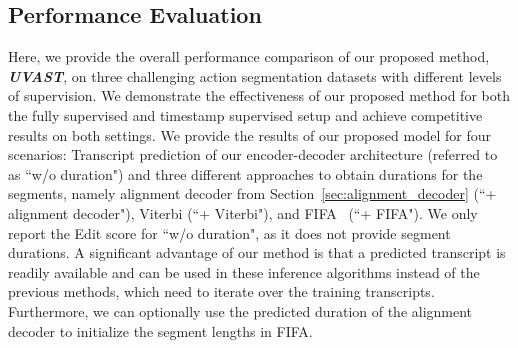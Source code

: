 \subsection{Performance Evaluation}
Here, we provide the overall performance comparison of our proposed method, \textit{\textbf{UVAST}}, on three challenging action segmentation datasets with different levels of supervision.
We demonstrate the effectiveness of our proposed method for both the fully supervised and timestamp supervised setup and achieve competitive results on both settings.
We provide the results of our proposed model for four scenarios: Transcript prediction of our encoder-decoder architecture (referred to as ``w/o duration") and three different approaches to obtain durations for the segments, namely alignment decoder from Section~\ref{sec:alignment_decoder} (``+ alignment decoder"), Viterbi (``+ Viterbi"), and FIFA~\cite{fifa2021} (``+ FIFA").
We only report the Edit score for ``w/o duration", as it does not provide segment durations. 
A significant advantage of our method is that a predicted transcript is readily available and can be used in these inference algorithms instead of the previous methods, which need to iterate over the training transcripts. Furthermore, we can optionally use the predicted duration of the alignment decoder to initialize the segment lengths in FIFA. 

